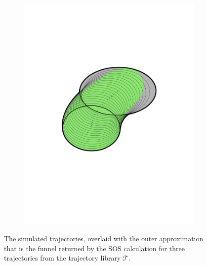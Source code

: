 \begin{figure}
\begin{subfigure}[b]{0.3\textwidth}
    \includegraphics[width=\textwidth]{figures/method/FunnelSimnew5}
  \end{subfigure}
  \caption{The simulated trajectories, overlaid with the outer approximation
    that is the funnel returned by the \ac{SOS} calculation for three
    trajectories from the trajectory library \(\mathcal{T}\).}
  \label{fig:funnel-simulated-overlaid}
\end{figure}

